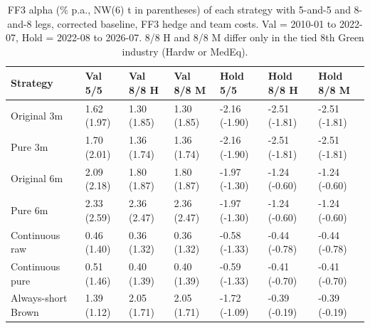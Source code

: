 \begin{table}
\caption{FF3 alpha (\% p.a., NW(6) t in parentheses) of each strategy with 5-and-5 and 8-and-8 legs, corrected baseline, FF3 hedge and team costs. Val = 2010-01 to 2022-07, Hold = 2022-08 to 2026-07. 8/8 H and 8/8 M differ only in the tied 8th Green industry (Hardw or MedEq).}
\label{tab:m2_q1_corr}
\begin{tabular}{lllllll}
\toprule
Strategy & Val 5/5 & Val 8/8 H & Val 8/8 M & Hold 5/5 & Hold 8/8 H & Hold 8/8 M \\
\midrule
Original 3m & 1.62 (1.97) & 1.30 (1.85) & 1.30 (1.85) & -2.16 (-1.90) & -2.51 (-1.81) & -2.51 (-1.81) \\
Pure 3m & 1.70 (2.01) & 1.36 (1.74) & 1.36 (1.74) & -2.16 (-1.90) & -2.51 (-1.81) & -2.51 (-1.81) \\
Original 6m & 2.09 (2.18) & 1.80 (1.87) & 1.80 (1.87) & -1.97 (-1.30) & -1.24 (-0.60) & -1.24 (-0.60) \\
Pure 6m & 2.33 (2.59) & 2.36 (2.47) & 2.36 (2.47) & -1.97 (-1.30) & -1.24 (-0.60) & -1.24 (-0.60) \\
Continuous raw & 0.46 (1.40) & 0.36 (1.32) & 0.36 (1.32) & -0.58 (-1.33) & -0.44 (-0.78) & -0.44 (-0.78) \\
Continuous pure & 0.51 (1.46) & 0.40 (1.39) & 0.40 (1.39) & -0.59 (-1.33) & -0.41 (-0.70) & -0.41 (-0.70) \\
Always-short Brown & 1.39 (1.12) & 2.05 (1.71) & 2.05 (1.71) & -1.72 (-1.09) & -0.39 (-0.19) & -0.39 (-0.19) \\
\bottomrule
\end{tabular}
\end{table}
